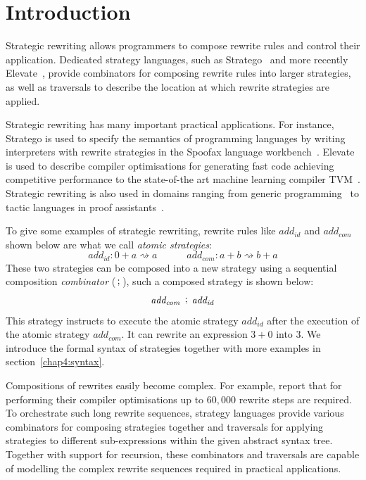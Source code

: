 \section{Introduction}
\label{chap4:introduction}
Strategic rewriting allows programmers to compose rewrite rules and control their application.
Dedicated strategy languages, such as Stratego~\citep{DBLP:conf/icfp/VisserBT98,10.1007/3-540-45127-7_27} and more recently Elevate~\citep{DBLP:journals/cacm/HagedornLKQGS23,DBLP:journals/pacmpl/HagedornLKQGS20}, provide combinators for composing rewrite rules into larger strategies, as well as traversals to describe the location at which rewrite strategies are applied.

Strategic rewriting has many important practical applications. For instance, Stratego is used to specify the semantics of programming languages by writing interpreters with rewrite strategies in the Spoofax language workbench~\citep{DBLP:journals/software/WachsmuthKV14}.
Elevate is used to describe compiler optimisations for generating fast code achieving competitive performance to the state-of-the art machine learning compiler TVM~\citep{DBLP:journals/pacmpl/HagedornLKQGS20}. Strategic rewriting is also used in domains ranging from generic programming~\citep{DBLP:conf/rule/LammelV02} to tactic languages in proof assistants~\citep{sozeau2014proof}.

\begin{highlightnew}
To give some examples of strategic rewriting, rewrite rules like $\mathit{add_{id}}$ and $\mathit{add_{com}}$ shown below are what we call \emph{atomic strategies}:
\[\mathit{add_{id}} : 0 + a \rightsquigarrow a \quad\quad\quad\mathit{add_{com}}: a + b \rightsquigarrow b + a\]
These two strategies can be composed into a new strategy using a sequential composition \emph{combinator} ($\, \mathrel{\mathop;} \,$), such a composed strategy is shown below:
\[\mathit{add_{com}}\, \mathrel{\mathop;} \,\mathit{add_{id}}\]
This strategy instructs to execute the atomic strategy $\mathit{add_{id}}$ after the execution of the atomic strategy $\mathit{add_{com}}$. It can rewrite an expression $3+0$ into $3$. We introduce the formal syntax of strategies together with more examples in section~\ref{chap4:syntax}.
\end{highlightnew}

Compositions of rewrites easily become complex.
For example, \citet{DBLP:journals/pacmpl/HagedornLKQGS20} report that for performing their compiler optimisations up to $60,000$ rewrite steps are required. To orchestrate such long rewrite sequences, strategy languages provide various combinators for composing strategies together and traversals for applying strategies to different sub-expressions within the given abstract syntax tree.
Together with support for recursion, these combinators and traversals are capable of modelling the complex rewrite sequences required in practical applications.

